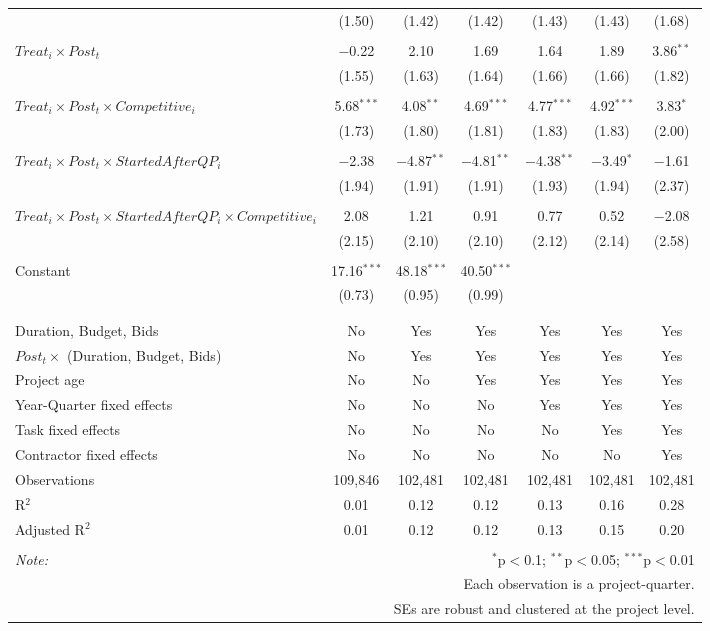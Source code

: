 \documentclass[
]{article}
\begin{document}
\begin{table}[H]
\begin{tabular}{@{\extracolsep{-3pt}}lcccccc}
  & (1.50) & (1.42) & (1.42) & (1.43) & (1.43) & (1.68) \\ 
  & & & & & & \\ 
 $Treat_i \times Post_t$ & $-$0.22 & 2.10 & 1.69 & 1.64 & 1.89 & 3.86$^{**}$ \\ 
  & (1.55) & (1.63) & (1.64) & (1.66) & (1.66) & (1.82) \\ 
  & & & & & & \\ 
 $Treat_i \times Post_t \times Competitive_i$ & 5.68$^{***}$ & 4.08$^{**}$ & 4.69$^{***}$ & 4.77$^{***}$ & 4.92$^{***}$ & 3.83$^{*}$ \\ 
  & (1.73) & (1.80) & (1.81) & (1.83) & (1.83) & (2.00) \\ 
  & & & & & & \\ 
 $Treat_i \times Post_t \times StartedAfterQP_i$ & $-$2.38 & $-$4.87$^{**}$ & $-$4.81$^{**}$ & $-$4.38$^{**}$ & $-$3.49$^{*}$ & $-$1.61 \\ 
  & (1.94) & (1.91) & (1.91) & (1.93) & (1.94) & (2.37) \\ 
  & & & & & & \\ 
 $Treat_i \times Post_t \times StartedAfterQP_i \times Competitive_i$ & 2.08 & 1.21 & 0.91 & 0.77 & 0.52 & $-$2.08 \\ 
  & (2.15) & (2.10) & (2.10) & (2.12) & (2.14) & (2.58) \\ 
  & & & & & & \\ 
 Constant & 17.16$^{***}$ & 48.18$^{***}$ & 40.50$^{***}$ &  &  &  \\ 
  & (0.73) & (0.95) & (0.99) &  &  &  \\ 
  & & & & & & \\ 
\hline \\[-1.8ex] 
Duration, Budget, Bids & No & Yes & Yes & Yes & Yes & Yes \\ 
$Post_t \times $  (Duration, Budget, Bids) & No & Yes & Yes & Yes & Yes & Yes \\ 
Project age & No & No & Yes & Yes & Yes & Yes \\ 
Year-Quarter fixed effects & No & No & No & Yes & Yes & Yes \\ 
Task fixed effects & No & No & No & No & Yes & Yes \\ 
Contractor fixed effects & No & No & No & No & No & Yes \\ 
Observations & 109,846 & 102,481 & 102,481 & 102,481 & 102,481 & 102,481 \\ 
R$^{2}$ & 0.01 & 0.12 & 0.12 & 0.13 & 0.16 & 0.28 \\ 
Adjusted R$^{2}$ & 0.01 & 0.12 & 0.12 & 0.13 & 0.15 & 0.20 \\ 
\hline 
\hline \\[-1.8ex] 
\textit{Note:}  & \multicolumn{6}{r}{$^{*}$p$<$0.1; $^{**}$p$<$0.05; $^{***}$p$<$0.01} \\ 
 & \multicolumn{6}{r}{Each observation is a project-quarter.} \\ 
 & \multicolumn{6}{r}{SEs are robust and clustered at the project level.} \\ 
\end{tabular} 
\end{table}
\end{document}
